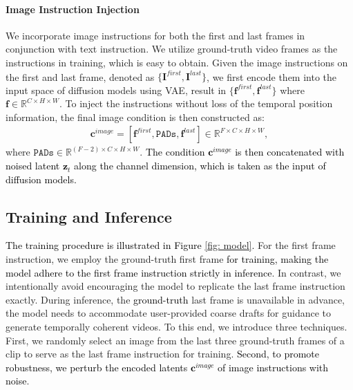 \documentclass[10pt,twocolumn,letterpaper]{article}
\newcommand{\tcb}{\textcolor{black}}
\newcommand{\tcr}{\textcolor{black}}
\newcommand{\tco}{\textcolor{black}}
\begin{document}
\paragraph{Image Instruction Injection}
We incorporate image instructions for both the first and last frames in conjunction with text instruction. We utilize ground-truth video frames as the instructions in training, which is easy to obtain. Given the image instructions on the first and last frame, denoted as $\{ \mathbf{I}^{first}, \mathbf{I}^{last} \}$, we first encode them into the 
input space of diffusion models using VAE, result in $\{ \mathbf{f}^{first}, \mathbf{f}^{last} \}$ where $\mathbf{f}\in \mathbb{R}^{C\times H\times W}$. To inject the instructions without loss of the temporal position information, the final image condition is then constructed as:
\begin{align}
\mathbf{c}^{image} = [\mathbf{f}^{first}, \texttt{PADs}, \mathbf{f}^{last}]\in \mathbb{R}^{F \times C\times H \times W},
\label{eq: cat_condition}
\end{align}
where $\texttt{PADs} \in \mathbb{R}^{\left(F-2\right) \times C \times H \times W} $. \tcr{The condition $\mathbf{c}^{image}$ is then concatenated with noised latent $\mathbf{z}_t$ along the channel dimension, which is taken as the input of diffusion models.}



\subsection{Training and Inference}
\label{sec: infer}

\tcb{The training procedure is illustrated in Figure \ref{fig: model}.}
For the first frame instruction, we employ the ground-truth first frame \tcb{for training, making the model adhere to the first frame instruction strictly in inference}. In contrast, we intentionally avoid encouraging the model to replicate the last frame instruction exactly. 
During inference, the \tco{ground-truth} last frame is unavailable in advance, the model needs to accommodate user-provided coarse drafts for guidance to generate temporally coherent videos. To this end, we introduce three techniques. First, we randomly select an image from the last three ground-truth frames of a clip to serve as the last frame instruction for training. 
\tcb{Second, to promote robustness, we perturb the encoded latents $\mathbf{c}^{image}$ of image instructions with noise}.
\end{document}
